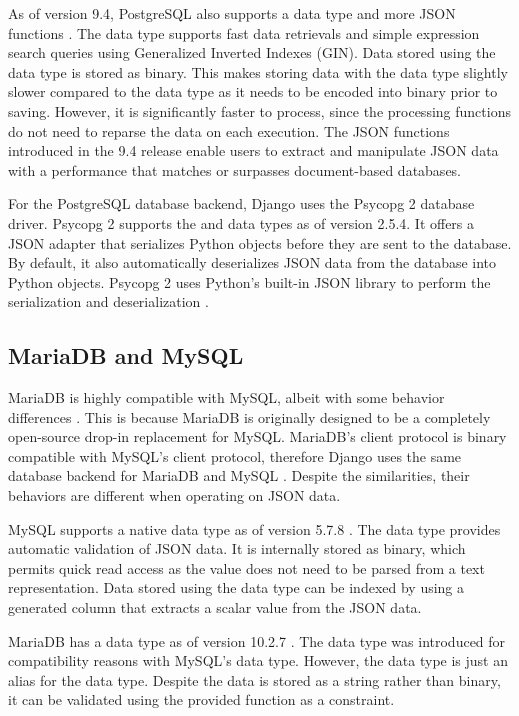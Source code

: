 As of version 9.4, PostgreSQL also supports a  data type and more
JSON functions \cite{postgresql:9.4}. The  data type supports fast
data retrievals and simple expression search queries using Generalized Inverted
Indexes (GIN). Data stored using the  data type is stored as
binary. This makes storing data with the  data type slightly slower
compared to the  data type as it needs to be encoded into binary
prior to saving. However, it is significantly faster to process, since the
processing functions do not need to reparse the data on each execution. The
JSON functions introduced in the 9.4 release enable users to extract and
manipulate JSON data with a performance that matches or surpasses
document-based databases.

For the PostgreSQL database backend, Django uses the Psycopg 2 database driver.
Psycopg 2 supports the  and  data types as of version
2.5.4. It offers a JSON adapter that serializes Python objects before they are
sent to the database. By default, it also automatically deserializes JSON data
from the database into Python objects. Psycopg 2 uses Python's built-in JSON
library to perform the serialization and deserialization
\cite{psycopg2:json-adaptation}.

\subsection{MariaDB and MySQL}

MariaDB is highly compatible with MySQL, albeit with some behavior differences
\cite{mariadb:compatibility}. This is because MariaDB is originally designed to
be a completely open-source drop-in replacement for MySQL. MariaDB's client
protocol is binary compatible with MySQL's client protocol, therefore Django
uses the same database backend for MariaDB and MySQL \cite{django:databases}.
Despite the similarities, their behaviors are different when operating on JSON
data.

MySQL supports a native  data type as of version 5.7.8
\cite{mysql:json}. The  data type provides automatic validation of
JSON data. It is internally stored as binary, which permits quick read access
as the value does not need to be parsed from a text representation. Data stored
using the  data type can be indexed by using a generated column that
extracts a scalar value from the JSON data.

MariaDB has a  data type as of version 10.2.7 \cite{mariadb:json}.
The  data type was introduced for compatibility reasons with MySQL's
 data type. However, the  data type is just an alias for
the  data type. Despite the data is stored as a string rather
than binary, it can be validated using the provided  function
as a  constraint.

